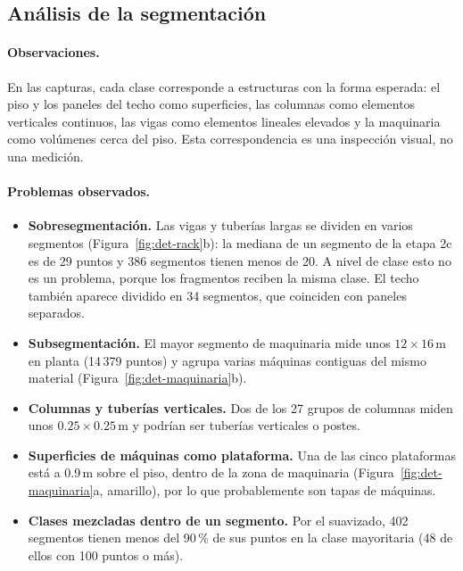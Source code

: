 \documentclass[11pt,a4paper]{article}
\begin{document}
\subsection{Análisis de la segmentación}

\paragraph{Observaciones.} En las capturas, cada clase corresponde a
estructuras con la forma esperada: el piso y los paneles del techo como
superficies, las columnas como elementos verticales continuos, las vigas como
elementos lineales elevados y la maquinaria como volúmenes cerca del piso.
Esta correspondencia es una inspección visual, no una medición.

\paragraph{Problemas observados.}
\begin{itemize}
  \item \textbf{Sobresegmentación.} Las vigas y tuberías largas se dividen en
        varios segmentos (Figura~\ref{fig:det-rack}b): la mediana de un
        segmento de la etapa 2c es de 29 puntos y 386 segmentos tienen menos de
        20. A nivel de clase esto no es un problema, porque los fragmentos
        reciben la misma clase. El techo también aparece dividido en 34
        segmentos, que coinciden con paneles separados.
  \item \textbf{Subsegmentación.} El mayor segmento de maquinaria mide unos
        $12 \times 16$\,m en planta (14\,379 puntos) y agrupa varias máquinas
        contiguas del mismo material (Figura~\ref{fig:det-maquinaria}b).
  \item \textbf{Columnas y tuberías verticales.} Dos de los 27 grupos de
        columnas miden unos $0.25 \times 0.25$\,m y podrían ser tuberías
        verticales o postes.
  \item \textbf{Superficies de máquinas como plataforma.} Una de las cinco
        plataformas está a 0.9\,m sobre el piso, dentro de la zona de
        maquinaria (Figura~\ref{fig:det-maquinaria}a, amarillo), por lo que
        probablemente son tapas de máquinas.
  \item \textbf{Clases mezcladas dentro de un segmento.} Por el suavizado, 402
        segmentos tienen menos del 90\,\% de sus puntos en la clase mayoritaria
        (48 de ellos con 100 puntos o más).
\end{itemize}
\end{document}
